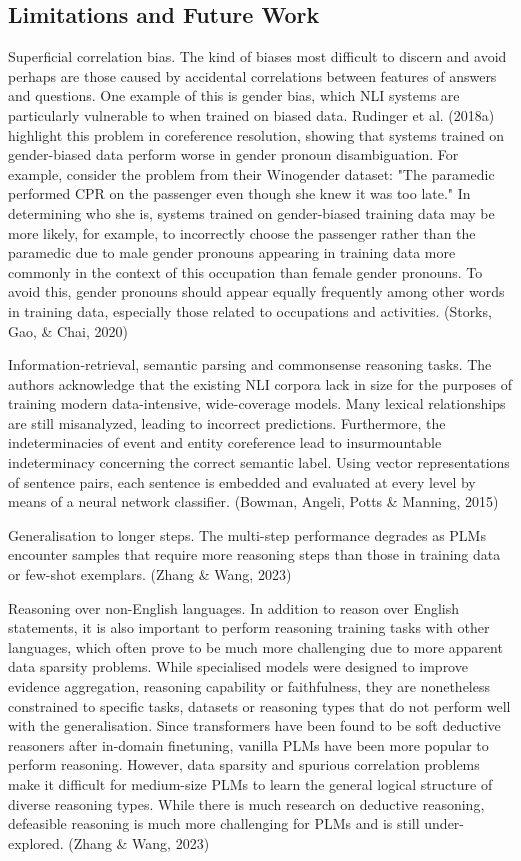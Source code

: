 \documentclass[fleqn,moreauthors,10pt]{ds_report}
\begin{document}
\subsection*{Limitations and Future Work}

Superficial correlation bias. The kind of biases most difficult to discern and avoid perhaps are those caused by accidental correlations between features of answers and questions. One example of this is gender bias, which NLI systems are particularly vulnerable to when trained on biased data. Rudinger et al. (2018a) highlight this problem in coreference resolution, showing that systems trained on gender-biased data perform worse in gender pronoun disambiguation. For example, consider the problem from their Winogender dataset: "The paramedic performed CPR on the passenger even though she knew it was too late." In determining who she is, systems trained on gender-biased training data may be more likely, for example, to incorrectly choose the passenger rather than the paramedic due to male gender pronouns appearing in training data more commonly in the context of this occupation than female gender pronouns. To avoid this, gender pronouns should appear equally frequently among other words in training data, especially those related to occupations and activities. (Storks, Gao, \& Chai, 2020)

Information-retrieval, semantic parsing and commonsense reasoning tasks. The authors acknowledge that the existing NLI corpora lack in size for the purposes of training modern data-intensive, wide-coverage models. Many lexical relationships are still misanalyzed, leading to incorrect predictions. Furthermore, the indeterminacies of event and entity coreference lead to insurmountable indeterminacy concerning the correct semantic label. Using vector representations of sentence pairs, each sentence is embedded and evaluated at every level by means of a neural network classifier. (Bowman, Angeli, Potts \& Manning, 2015)

Generalisation to longer steps. The multi-step performance degrades as PLMs encounter samples that require more reasoning steps than those in training data or few-shot exemplars. (Zhang \& Wang, 2023)

Reasoning over non-English languages. In addition to reason over English statements, it is also important to perform reasoning training tasks with other languages, which often prove to be much more challenging due to more apparent data sparsity problems. While specialised models were designed to improve evidence aggregation, reasoning capability or faithfulness, they are nonetheless constrained to specific tasks, datasets or reasoning types that do not perform well with  the generalisation. Since transformers have been found to be soft deductive reasoners after in-domain finetuning, vanilla PLMs have been more popular to perform reasoning. However, data sparsity and spurious correlation problems make it difficult for medium-size PLMs to learn the general logical structure of diverse reasoning types. While there is much research on deductive reasoning, defeasible reasoning is much more challenging for PLMs and is still under-explored. (Zhang \& Wang, 2023)
\end{document}
